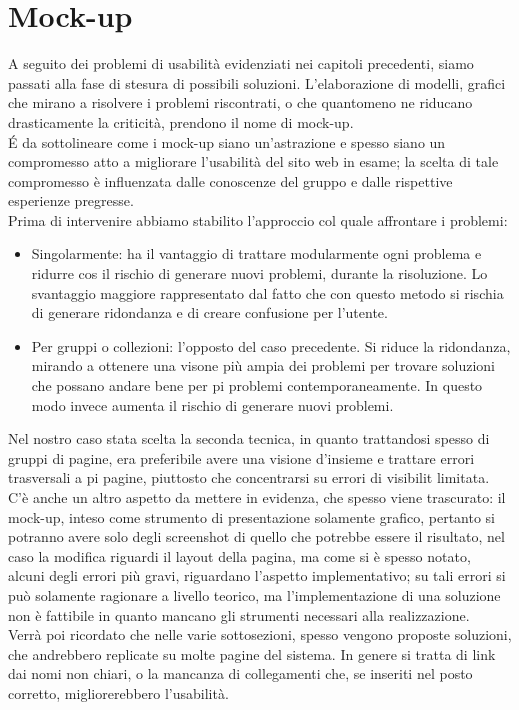 \chapter{Mock-up}
A seguito dei problemi di usabilità evidenziati nei capitoli precedenti, siamo passati alla fase di stesura di possibili soluzioni. L'elaborazione di modelli, grafici che mirano a risolvere i problemi riscontrati, o che quantomeno ne riducano drasticamente la criticità, prendono il nome di mock-up.\\
\'E da sottolineare come i mock-up siano un'astrazione e spesso siano un compromesso atto a  migliorare l'usabilità del sito web in esame; la scelta di tale compromesso è influenzata dalle conoscenze del gruppo e dalle rispettive esperienze pregresse.\\
Prima di intervenire abbiamo stabilito l'approccio col quale affrontare i problemi:
\begin{itemize}
\item Singolarmente: ha il vantaggio di trattare modularmente ogni problema e ridurre cos il rischio di generare nuovi problemi, durante la risoluzione. Lo svantaggio maggiore  rappresentato dal fatto che con questo metodo si rischia di generare ridondanza e di creare confusione per l'utente.
\item Per gruppi o collezioni:  l'opposto del caso precedente. Si riduce la ridondanza, mirando a ottenere una visone più ampia dei problemi per trovare  soluzioni che possano andare bene per pi problemi contemporaneamente. In questo modo invece aumenta il rischio di generare nuovi problemi.
\end{itemize}
Nel nostro caso  stata scelta la seconda tecnica, in quanto trattandosi spesso di gruppi di pagine, era preferibile avere una visione d'insieme e trattare errori trasversali a pi pagine, piuttosto che concentrarsi su errori di visibilit limitata.\\
C'è anche un altro aspetto da mettere in evidenza, che spesso viene trascurato: il mock-up, inteso come strumento di presentazione solamente grafico, pertanto si potranno avere solo degli screenshot di quello che potrebbe essere il risultato, nel caso la modifica riguardi il layout della pagina, ma come si è spesso notato, alcuni degli errori più gravi, riguardano l'aspetto implementativo; su tali errori si può solamente ragionare a livello teorico, ma l'implementazione di una soluzione non è fattibile in quanto mancano gli strumenti necessari alla realizzazione.\\ 
Verrà poi ricordato che nelle varie sottosezioni, spesso vengono proposte soluzioni, che andrebbero replicate su molte pagine del sistema. In genere si tratta di link dai nomi non chiari, o la mancanza di collegamenti che, se inseriti nel posto corretto, migliorerebbero l'usabilità.\\
